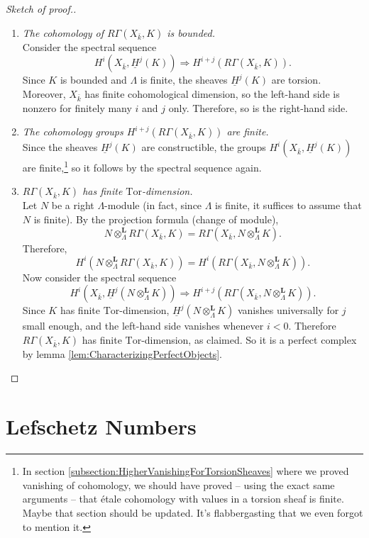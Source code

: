 \begin{proof}[Sketch of proof.] $ $
\begin{enumerate}
\item
{\it The cohomology of $R\Gamma(X_{\bar k}, K)$ is bounded.}
\\
Consider the spectral sequence
$$
H^i(X_{\bar k}, \underline H^j(K)) \Rightarrow H^{i+j} (R\Gamma(X_{\bar k}, K)).
$$
Since $K$ is bounded and $\Lambda$ is finite, the sheaves $\underline H^j(K)$ 
are torsion. Moreover, $X_{\bar k}$ has finite cohomological dimension, so the 
left-hand side is nonzero for finitely many $i$ and $j$ only. Therefore, so is 
the right-hand side.
\item
{\it The cohomology groups $H^{i+j} (R\Gamma(X_{\bar k}, K))$ are finite.}
\\
Since the sheaves $\underline H^j(K)$ are constructible, the groups 
$H^i(X_{\bar k}, \underline H^j(K))$ are finite,\footnote{In section 
\ref{subsection:HigherVanishingForTorsionSheaves} where we proved vanishing of 
cohomology, we should have proved -- using the exact same arguments -- that 
\'etale cohomology with values in a torsion sheaf is finite. Maybe that section 
should be updated. It's flabbergasting that we even forgot to mention it.} so 
it follows by the spectral sequence again. 
\item
{\it $R\Gamma(X_{\bar k}, K)$ has finite $\text{Tor}$-dimension.}
\\
Let $N$ be a right $\Lambda$-module (in fact, since $\Lambda$ is finite, it 
suffices to assume that $N$ is finite). By the projection formula (change of 
module), 
$$
N\otimes^\mathbf{L}_\Lambda R \Gamma(X_{\bar k}, K) = R\Gamma(X_{\bar k}, 
N\otimes^\mathbf{L}_\Lambda K).
$$
Therefore,
$$
H^i (N\otimes^\mathbf{L}_\Lambda R\Gamma(X_{\bar k}, K)) = H^i(R\Gamma(X_{\bar 
k}, N \otimes_{\Lambda}^\mathbf{L} K)).
$$
Now consider the spectral sequence
$$
H^i (X_{\bar k}, \underline H^j (N\otimes_{\Lambda}^\mathbf{L} K))
\Rightarrow
H^{i+j}(R\Gamma(X_{\bar k}, N \otimes_{\Lambda}^\mathbf{L} K)).
$$
Since $K$ has finite $\text{Tor}$-dimension, $\underline H^j 
(N\otimes_{\Lambda}^\mathbf{L} K)$ vanishes universally for $j$ small enough, 
and the left-hand side vanishes whenever $i < 0$. Therefore $R\Gamma(X_{\bar 
k}, K)$ has finite $\text{Tor}$-dimension, as claimed. So it is a perfect 
complex by lemma \ref{lem:CharacterizingPerfectObjects}.
\end{enumerate}
\end{proof}

\section{Lefschetz Numbers}

